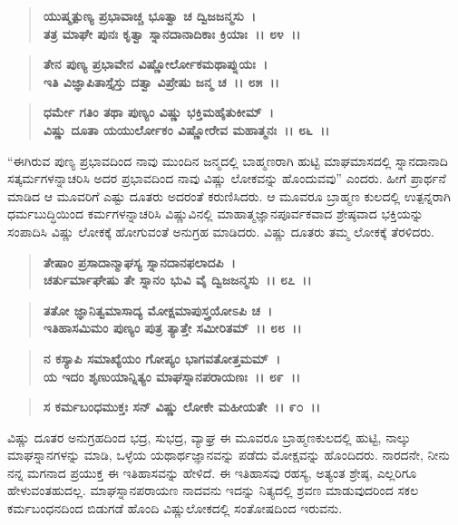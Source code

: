 \begin{verse}
\textbf{ಯುಷ್ಮತ್ಪುಣ್ಯ ಪ್ರಭಾವಾಚ್ಚ ಭೂತ್ವಾ ಚ ದ್ವಿಜಜನ್ಮಸು~।}\\\textbf{ತತ್ರ ಮಾಘೇ ಪುನಃ ಕೃತ್ವಾ ಸ್ನಾನದಾನಾದಿಕಾಃ ಕ್ರಿಯಾಃ~।। ೮೪~।।} 
\end{verse}

\begin{verse}
\textbf{ತೇನ ಪುಣ್ಯ ಪ್ರಭಾವೇನ ವಿಷ್ಣೋರ್ಲೋಕಮಥಾಪ್ನುಯಃ~।}\\\textbf{ಇತಿ ವಿಜ್ಞಾಪಿತಾಸ್ತೈಸ್ತು ದತ್ವಾ ವಿಪ್ರೇಷು ಜನ್ಮ ಚ~।। ೮೫~।। }
\end{verse}

\begin{verse}
\textbf{ಧರ್ಮೇ ಗತಿಂ ತಥಾ ಪುಣ್ಯಂ ವಿಷ್ಣು ಭಕ್ತಿಮಹೈತುಕೀಮ್~।}\\\textbf{ವಿಷ್ಣು ದೂತಾ ಯಯುರ್ಲೋಕಂ ವಿಷ್ಣೋರೇವ ಮಹಾತ್ಮನಃ~।। ೮೬~।।}
\end{verse}

“ಈಗಿರುವ ಪುಣ್ಯ ಪ್ರಭಾವದಿಂದ ನಾವು ಮುಂದಿನ ಜನ್ಮದಲ್ಲಿ ಬಾಹ್ಮಣರಾಗಿ ಹುಟ್ಟಿ ಮಾಘಮಾಸದಲ್ಲಿ ಸ್ನಾನದಾನಾದಿ ಸತ್ಕರ್ಮಗಳನ್ನಾಚರಿಸಿ ಅದರ ಪ್ರಭಾವದಿಂದ ನಾವು ವಿಷ್ಣು ಲೋಕವನ್ನು ಹೊಂದುವವು” ಎಂದರು. ಹೀಗೆ ಪ್ರಾರ್ಥನೆ ಮಾಡಿದ ಆ ಮೂವರಿಗೆ ಎಷ್ಟು ದೂತರು ಅದರಂತೆ ಕರುಣಿಸಿದರು. ಆ ಮೂವರೂ ಬ್ರಾಹ್ಮಣ ಕುಲದಲ್ಲಿ ಉತ್ಪನ್ನರಾಗಿ ಧರ್ಮಬುದ್ಧಿಯಿಂದ ಕರ್ಮಗಳನ್ನಾಚರಿಸಿ ವಿಷ್ಣುವಿನಲ್ಲಿ ಮಾಹಾತ್ಮಜ್ಞಾನಪೂರ್ವಕವಾದ ಶ್ರೇಷ್ಠವಾದ ಭಕ್ತಿಯನ್ನು ಸಂಪಾದಿಸಿ ವಿಷ್ಣು ಲೋಕಕ್ಕೆ ಹೋಗುವಂತೆ ಅನುಗ್ರಹ ಮಾಡಿದರು. ವಿಷ್ಣು ದೂತರು ತಮ್ಮ ಲೋಕಕ್ಕೆ ತೆರಳಿದರು.

\begin{verse}
\textbf{ತೇಷಾಂ ಪ್ರಸಾದಾನ್ಮಾಘಸ್ಯ ಸ್ನಾನದಾನಫಲಾದಪಿ~।}\\\textbf{ಚರ್ತುರ್ಮಾಘೇಷು ತೇ ಸ್ನಾನಂ ಭುವಿ ವೈ ದ್ವಿಜಜನ್ಮಸು~।। ೮೭~।। }
\end{verse}

\begin{verse}
\textbf{ತತೋ ಜ್ಞಾನಿತ್ವಮಾಸಾದ್ಯ ಮೋಕ್ಷಮಾಪುಸ್ತ್ರಯೋಽಪಿ ಚ~।}\\\textbf{ಇತಿಹಾಸಮಿಮಂ ಪುಣ್ಯಂ ಪುತ್ರ ತ್ಯಾತ್ತೇ ಸಮೀರಿತಮ್~।। ೮೮~।। }
\end{verse}

\begin{verse}
\textbf{ನ ಕಸ್ಯಾಪಿ ಸಮಾಖ್ಯೆಯಂ ಗೋಪ್ಯಂ ಭಾಗವತೋತ್ತಮಮ್~।}\\\textbf{ಯ ಇದಂ ಶೃಣುಯಾನ್ನಿತ್ಯಂ ಮಾಘಸ್ನಾನಪರಾಯಣಃ~।। ೮೯~।। }
\end{verse}

\begin{verse}
\textbf{ಸ ಕರ್ಮಬಂಧಮುಕ್ತಃ ಸನ್ ವಿಷ್ಣು ಲೋಕೇ ಮಹೀಯತೇ~।। ೯೦~।।}
\end{verse}

ವಿಷ್ಣು ದೂತರ ಅನುಗ್ರಹದಿಂದ ಭದ್ರ, ಸುಭದ್ರ, ವ್ಯಾಘ್ರ ಈ ಮೂವರೂ ಬ್ರಾಹ್ಮಣಕುಲದಲ್ಲಿ ಹುಟ್ಟಿ, ನಾಲ್ಕು ಮಾಘಸ್ನಾನಗಳನ್ನು ಮಾಡಿ, ಒಳ್ಳೆಯ ಯಥಾರ್ಥಜ್ಞಾನವನ್ನು ಪಡೆದು ಮೋಕ್ಷವನ್ನು ಹೊಂದಿದರು. ನಾರದನೇ, ನೀನು ನನ್ನ ಮಗನಾದ ಪ್ರಯುಕ್ತ ಈ ಇತಿಹಾಸವನ್ನು ಹೇಳಿದೆ. ಈ ಇತಿಹಾಸವು ರಹಸ್ಯ, ಅತ್ಯಂತ ಶ್ರೇಷ್ಠ, ಎಲ್ಲರಿಗೂ ಹೇಳುವಂತಹುದಲ್ಲ. ಮಾಘಸ್ನಾನಪರಾಯಣ ನಾದವನು ಇದನ್ನು ನಿತ್ಯದಲ್ಲಿ ಶ್ರವಣ ಮಾಡುವುದರಿಂದ ಸಕಲ ಕರ್ಮಬಂಧನದಿಂದ ಬಿಡುಗಡೆ ಹೊಂದಿ ವಿಷ್ಣುಲೋಕದಲ್ಲಿ ಸಂತೋಷದಿಂದ ಇರುವನು.

